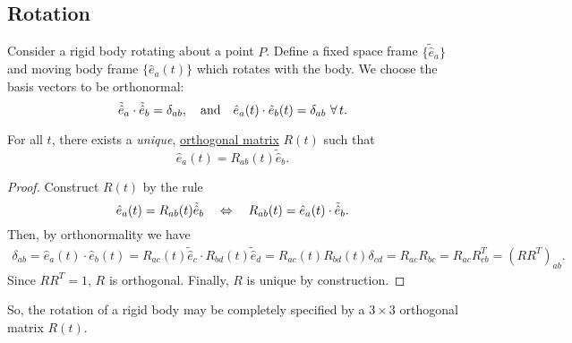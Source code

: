 \documentclass{article}
\begin{document}
\subsection{Rotation}
Consider a rigid body rotating about a point $P$. Define a fixed space frame $\{ \tilde{\hat{e}}_a \}$ and moving body frame $\{ \hat{e}_a(t) \}$ which rotates with the body. We choose the basis vectors to be orthonormal:
\begin{equation}
    \tilde{\hat{e}}_a \cdot \tilde{\hat{e}}_b = \delta_{ab}, \qq{and} \hat{e}_a (t) \cdot \hat{e}_b (t) = \delta_{ab} \,\, \forall \, t.
\end{equation}
\begin{proposition}
    For all $t$, there exists a \textit{unique}, \href{https://en.wikipedia.org/wiki/Orthogonal_matrix}{orthogonal matrix} $R(t)$ such that
    \begin{equation}
        \hat{e}_a (t) = R_{ab}(t) \tilde{\hat{e}}_b.
    \end{equation}
\end{proposition}
\begin{proof}
    Construct $R(t)$ by the rule
    \[
     \hat{e}_a (t) = R_{ab}(t) \tilde{\hat{e}}_b \quad \Leftrightarrow \quad R_{ab}(t) = \hat{e}_a (t) \cdot \tilde{\hat{e}}_b.
    \]
    Then, by orthonormality we have
    \begin{align*}
        \delta_{ab} = \hat{e}_a (t) \cdot \hat{e}_b (t) = R_{ac}(t) \tilde{\hat{e}}_c \cdot R_{bd}(t) \tilde{\hat{e}}_d = R_{ac}(t)R_{bd}(t) \delta_{cd} = R_{ac} R_{bc} = R_{ac}R^{T}_{cb} = (RR^{T})_{ab}.
    \end{align*}
    Since $RR^T = 1$, $R$ is orthogonal. Finally, $R$ is unique by construction.
\end{proof}
So, the rotation of a rigid body may be completely specified by a $3\times3$ orthogonal matrix $R(t)$.
\begin{wrapfigure}{r}{0cm}
\end{wrapfigure}
\end{document}
